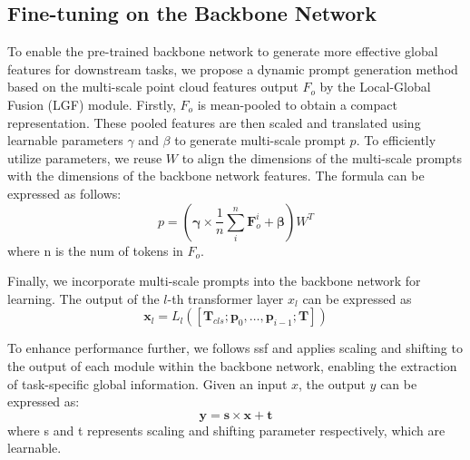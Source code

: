 \subsection{Fine-tuning on the Backbone Network}
To enable the pre-trained backbone network to generate more effective global features for downstream tasks, we propose a dynamic prompt generation method based on the multi-scale point cloud features output $F_{o}$ by the Local-Global Fusion (LGF) module. Firstly, $F_{o}$ is mean-pooled to obtain a compact representation. These pooled features are then scaled and translated using learnable parameters $\gamma$ and $\beta$ to generate multi-scale prompt $p$. To efficiently utilize parameters, we reuse $W$ to align the dimensions of the multi-scale prompts with the dimensions of the backbone network features. The formula can be expressed as follows:
\begin{equation}
    p = \left( \boldsymbol{\gamma} \times \frac{1}{n}\sum_i^n{\boldsymbol{F}_{o}^i} + \boldsymbol{\beta} \right) W^T
\end{equation}
where n is the num of tokens in $F_o$.

Finally, we incorporate multi-scale prompts into the backbone network for learning. The output of the $l$-th transformer layer $x_l$ can be expressed as
\begin{equation}
    \boldsymbol{x}_l=L_l\left(\left[\boldsymbol{T}_{c l s} ; \boldsymbol{p}_{0}, \ldots, \boldsymbol{p}_{i-1} ; \boldsymbol{T}\right]\right)
\end{equation}

To enhance performance further, we follows ssf\cite{lian2022scaling} and applies scaling and shifting to the output of each module within the backbone network, enabling the extraction of task-specific global information. Given an input $x$, the output $y$ can be expressed as:
\begin{equation}
    \boldsymbol{y} = \boldsymbol{s} \times \boldsymbol{x} + \boldsymbol{t}
\end{equation}
where s and t represents scaling and shifting parameter respectively, which are learnable.
